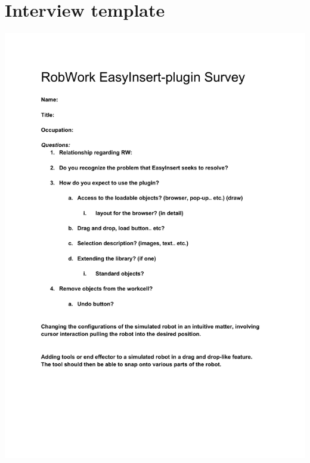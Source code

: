 \section{Interview template}
\label{app:interviewTemp}

\includegraphics[trim={2.5cm 0 0 0.5cm}]{Standardfiler/Appendix/Interview.pdf}